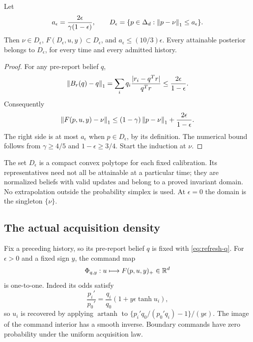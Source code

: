 \begin{lemma}\label{lem:refresh-domain}
Let
\begin{equation}\label{eq:refresh-radius}
 a_\epsilon=\frac{2\epsilon}{\gamma(1-\epsilon)},
 \qquad
 D_\epsilon=\{p\in\Delta_d:\left\lVert p-\nu\right\rVert_1\le a_\epsilon\}.
\end{equation}
Then $\nu\in D_\epsilon$, $F(D_\epsilon,u,y)\subset D_\epsilon$, and
$a_\epsilon\le(10/3)\epsilon$. Every attainable posterior belongs to
$D_\epsilon$, for every time and every admitted history.
\end{lemma}
\begin{proof}
For any pre-report belief $q$,
\[
 \left\lVert B_r(q)-q\right\rVert_1
 =\sum_iq_i\frac{|r_i-q^Tr|}{q^Tr}
 \le\frac{2\epsilon}{1-\epsilon}.
\]
Consequently
\[
 \left\lVert F(p,u,y)-\nu\right\rVert_1
 \le(1-\gamma)\left\lVert p-\nu\right\rVert_1
          +\frac{2\epsilon}{1-\epsilon}.
\]
The right side is at most $a_\epsilon$ when $p\in D_\epsilon$, by its
definition. The numerical bound follows from
$\gamma\ge4/5$ and $1-\epsilon\ge3/4$. Start the induction at $\nu$.
\end{proof}

The set $D_\epsilon$ is a compact convex polytope for each fixed
calibration. Its representatives need not all be attainable at a particular
time; they are normalized beliefs with valid updates and belong to a proved
invariant domain. No extrapolation outside the probability simplex is used.
At $\epsilon=0$ the domain is the singleton $\{\nu\}$.

\subsection{The actual acquisition density}
Fix a preceding history, so its pre-report belief $q$ is fixed with
\eqref{eq:refresh-q}. For $\epsilon>0$ and a fixed sign $y$, the command
map
\[
 \Phi_{q,y}:u\longmapsto F(p,u,y)_+\in\mathbb R^d
\]
is one-to-one. Indeed its odds satisfy
\begin{equation}\label{eq:refresh-odds}
 \frac{p_i'}{p_0'}=\frac{q_i}{q_0}(1+y\epsilon\tanh u_i),
\end{equation}
so $u_i$ is recovered by applying $\operatorname{artanh}$ to
$\{p_i'q_0/(p_0'q_i)-1\}/(y\epsilon)$. The image of the command interior
has a smooth inverse. Boundary commands have zero probability under the
uniform acquisition law.


